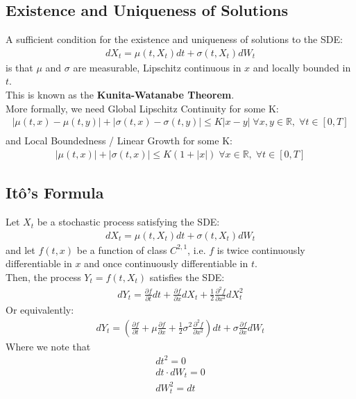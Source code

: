\subsection{Existence and Uniqueness of Solutions}
A sufficient condition for the existence and uniqueness of solutions to the SDE:
\begin{align*}
    dX_t = \mu(t, X_t)dt + \sigma(t, X_t)dW_t
\end{align*}
is that $\mu$ and $\sigma$ are measurable, Lipschitz continuous in $x$ and locally bounded in $t$.\\
This is known as the \textbf{Kunita-Watanabe Theorem}.\\
More formally, we need Global Lipschitz Continuity for some K:
\begin{align*}
    |\mu(t, x) - \mu(t, y)| + |\sigma(t, x) - \sigma(t, y)| \leq K|x-y| \; \forall x, y \in \mathbb{R}, \; \forall t \in [0, T] \\
\end{align*}
and Local Boundedness / Linear Growth for some K:
\begin{align*}
    |\mu(t, x)| + |\sigma(t, x)| \leq K(1 + |x|) \; \forall x \in \mathbb{R}, \; \forall t \in [0, T]
\end{align*}

\subsection{It\^{o}'s Formula}
\begin{theorem}[It\^{o}'s Formula]
Let $X_t$ be a stochastic process satisfying the SDE:
\begin{align*}
    dX_t = \mu(t, X_t)dt + \sigma(t, X_t)dW_t
\end{align*}
and let $f(t, x)$ be a function of class $C^{2, 1}$, i.e. $f$ is twice continuously differentiable in $x$ and once continuously differentiable in $t$.\\
Then, the process $Y_t = f(t, X_t)$ satisfies the SDE:
\begin{align*}
    dY_t = \frac{\partial f}{\partial t} dt + \frac{\partial f}{\partial x} dX_t + \frac{1}{2} \frac{\partial^2 f}{\partial x^2} dX_t^2
\end{align*}
Or equivalently:
\begin{align*}
    dY_t = \left(\frac{\partial f}{\partial t} + \mu \frac{\partial f}{\partial x} + \frac{1}{2} \sigma^2 \frac{\partial^2 f}{\partial x^2}\right)dt + \sigma \frac{\partial f}{\partial x}dW_t
\end{align*}
Where we note that
\begin{align*}
    dt^2 = 0\\
    dt \cdot dW_t = 0\\
    dW_t^2 = dt
\end{align*}
\end{theorem}




